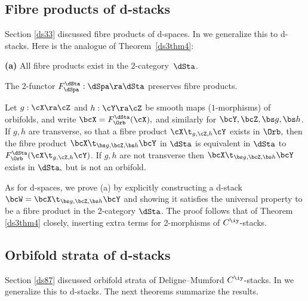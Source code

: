 \documentclass{article}
\begin{document}
\subsection{Fibre products of d-stacks}
\label{ds104}

Section \ref{ds33} discussed fibre products of d-spaces. In \cite[\S
9.5]{Joyc6} we generalize this to d-stacks. Here is the analogue of
Theorem~\ref{ds3thm4}:

\begin{thm}{\bf(a)} All fibre products exist in the
$2$-category~$\dSta$.
\smallskip

 The\/ $2$-functor\/ $F_\dSpa^\dSta:\dSpa\ra\dSta$
preserves fibre products.
\smallskip

 Let\/ $g:\cX\ra\cZ$ and\/ $h:\cY\ra\cZ$ be smooth
maps (\/$1$-morphisms) of orbifolds, and write\/
$\bcX=F_\Orb^\dSta(\cX),$ and similarly for\/ $\bcY,\bcZ,\bs g,\bs
h$. If\/ $g,h$ are transverse,
so that a fibre product $\cX\t_{g,\cZ,h}\cY$ exists in $\Orb,$ then
the fibre product\/ $\bcX\t_{\bs g,\bcZ,\bs h}\bcY$ in $\dSta$ is
equivalent in $\dSta$ to\/ $F_\Orb^\dSta(\cX\t_{g,\cZ,h}\cY)$. If\/
$g,h$ are not transverse then $\bcX\t_{\bs g,\bcZ,\bs h}\bcY$ exists
in $\dSta,$ but is not an orbifold.
\label{ds10thm6}
\end{thm}

As for d-spaces, we prove (a) by explicitly constructing a d-stack
$\bcW=\bcX\t_{\bs g,\bcZ,\bs h}\bcY$ and showing it satisfies the
universal property to be a fibre product in the 2-category $\dSta$.
The proof follows that of Theorem \ref{ds3thm4} closely, inserting
extra terms for 2-morphisms of $C^\iy$-stacks.

\subsection{Orbifold strata of d-stacks}
\label{ds105}

Section \ref{ds87} discussed orbifold strata of Deligne--Mumford
$C^\iy$-stacks. In \cite[\S 9.6]{Joyc6} we generalize this to
d-stacks. The next theorems summarize the results.
\end{document}
